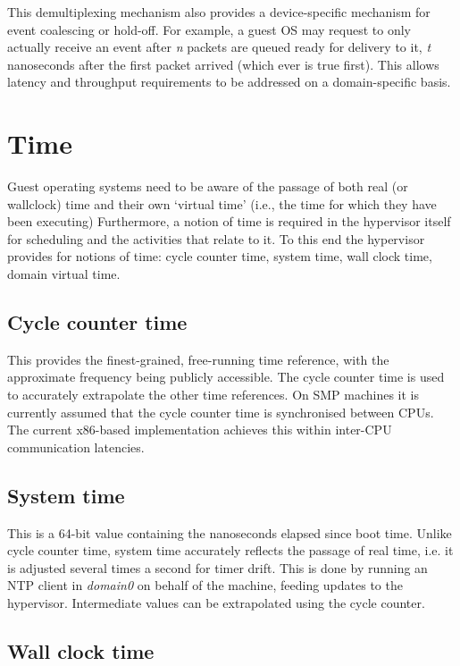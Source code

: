 \documentclass[11pt,twoside,final,openright]{xenstyle}
\begin{document}
This demultiplexing mechanism also provides a device-specific mechanism for 
event coalescing or hold-off.  For example, a guest OS may request to only 
actually receive an event after {\it n} packets are queued ready for delivery
to it, {\it t} nanoseconds after the first packet arrived (which ever is true
first).  This allows latency and throughput requirements to be addressed on a
domain-specific basis.


\chapter{Time}

Guest operating systems need to be aware of the passage of both real
(or wallclock) time and their own `virtual time' (i.e., the time for
which they have been executing) Furthermore, a notion of time is
required in the hypervisor itself for scheduling and the activities
that relate to it.  To this end the hypervisor provides for notions of
time: cycle counter time, system time, wall clock time, domain virtual
time.

\section{Cycle counter time}

This provides the finest-grained, free-running time reference, with the
approximate frequency being publicly accessible.  The cycle counter time is
used to accurately extrapolate the other time references.  On SMP machines
it is currently assumed that the cycle counter time is synchronised between
CPUs.  The current x86-based implementation achieves this within inter-CPU
communication latencies.

\section{System time}

This is a 64-bit value containing the nanoseconds elapsed since boot
time.  Unlike cycle counter time, system time accurately reflects the
passage of real time, i.e.  it is adjusted several times a second for timer
drift.  This is done by running an NTP client in {\it domain0} on behalf of
the machine, feeding updates to the hypervisor.  Intermediate values can be
extrapolated using the cycle counter.

\section{Wall clock time}
\end{document}
